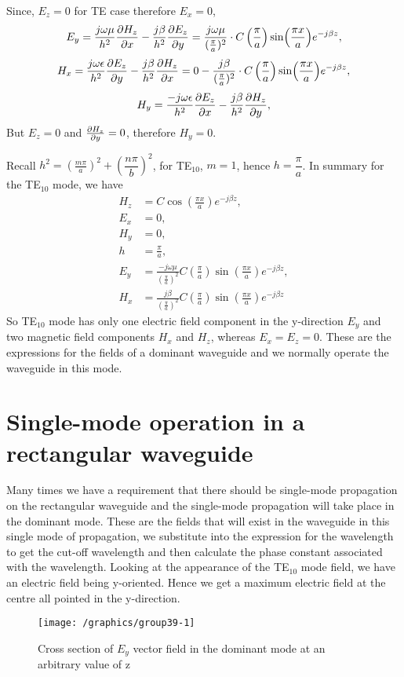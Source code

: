 Since, $E_z = 0$ for TE case therefore $E_x = 0$,
\begin{dmath*}
E_y = \frac{j\omega\mu}{h^2}\pdv{ H_z}{x} - \frac{j\beta}{h^2}\pdv{E_z}{y} = \frac{j\omega\mu}{(\frac{\pi}{a})^2} \cdot C\left(\frac{\pi}{a}\right)\sin(\frac{\pi x}{a})e^{-j\beta z},
\end{dmath*} 
\begin{dmath*}
H_x = \frac{j\omega\epsilon}{h^2}\pdv{E_z}{y} - \frac{j\beta}{h^2}\pdv{H_z}{x}= 0 - \frac{j\beta}{(\frac{\pi}{a})^2} \cdot C\left(\frac{\pi}{a}\right)\sin(\frac{\pi x}{a})e^{-j\beta z},
\end{dmath*}
\begin{dmath*}
H_y = \frac{-j\omega\epsilon}{h^2}\pdv{E_z}{x} -  \frac{j\beta}{h^2}\pdv{H_z}{y}, 
\end{dmath*}
But $E_z = 0$ and $\pdv{H_z}{y} = 0$, therefore $H_y = 0$. 

Recall $h^2 =\left(\frac{m\pi}{a}\right)^2 + \left(\dfrac{n\pi}{b}\right)^2$,  for TE$_{10}$, $m = 1$, hence $h = \dfrac{\pi}{a}$. In summary for the TE$_{10}$ mode, we have 
\begin{align}
H_z &= C\cos(\frac{\pi x}{a})e^{-j\beta z},\\
E_x &= 0,\\
H_y &= 0,\\
h &= \frac{\pi}{a},\\
E_y &=\frac{-j\omega\mu }{(\frac{\pi}{a})^2}C\left(\frac{\pi}{a}\right)\sin(\frac{\pi x}{a})e^{-j\beta z},\\ 
H_x &= \frac{j\beta}{(\frac{\pi}{a})^2}C\left(\frac{\pi}{a}\right)\sin(\frac{\pi x}{a})e^{-j\beta z} 
\end{align}
So TE$_{10}$ mode has only one electric field component in the y-direction $E_y$ and two magnetic field components $H_x$ and $H_z$, whereas $E_x = E_z = 0$. These are the expressions for the fields of a dominant waveguide and we normally operate the waveguide in this mode.

\section{Single-mode operation in a rectangular waveguide}
 Many times we have a requirement that there should be single-mode propagation on the rectangular waveguide and the single-mode propagation will take place in the dominant mode. These are the fields that will exist in the waveguide in this single mode of propagation, we substitute into the expression for the wavelength to get the cut-off wavelength and then calculate the phase constant associated with the wavelength. Looking at the appearance of the TE$_{10}$ mode field, we have an electric field being y-oriented. Hence we get a maximum electric field at the centre all pointed in the y-direction.
\begin{figure}[h]
\centering
\texttt{[image: /graphics/group39-1]}
\caption{Cross section of $E_y$ vector field in the dominant mode at an arbitrary value of z}
\label{fig:lec39-1}
\end{figure}

